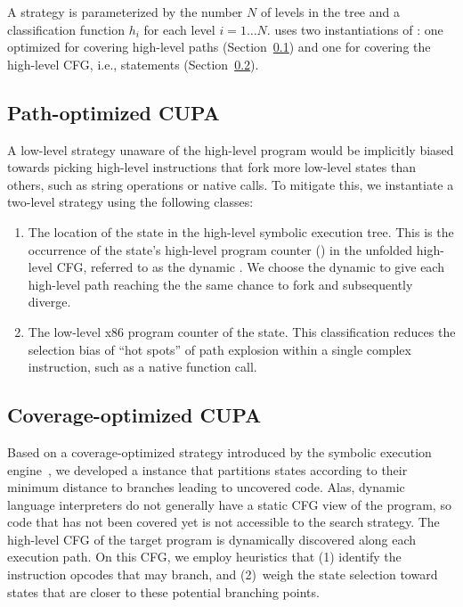 A \cupa strategy is parameterized by the number $N$ of levels in the tree and a classification function $h_i$ for each level $i=1 \ldots N$.  \chef uses two instantiations of \cupa: one optimized for covering high-level paths (Section~\ref{sec:chef:cupa-paths}) and one for covering the high-level CFG, i.e., statements (Section~\ref{sec:chef:cupa-coverage}).

\subsection{Path-optimized CUPA}
\label{sec:chef:cupa-paths}

A low-level strategy unaware of the high-level program would be implicitly biased towards picking high-level instructions that fork more low-level states than others, such as string operations or native calls.
%
To mitigate this, we instantiate a two-level \cupa strategy using the following classes:
\begin{enumerate}
\item The location of the state in the high-level symbolic execution tree.  This is the occurrence of the state's high-level program counter (\hlpc) in the unfolded high-level CFG, referred to as the dynamic \hlpc.  We choose the dynamic \hlpc to give each high-level path reaching the \hlpc the same chance to fork and subsequently diverge.
\item The low-level x86 program counter of the state.  This classification reduces the selection bias of ``hot spots'' of path explosion within a single complex instruction, such as a native function call.
\end{enumerate}

\subsection{Coverage-optimized CUPA}
\label{sec:chef:cupa-coverage}

Based on a coverage-optimized strategy introduced by the \klee symbolic execution engine~\cite{klee}, we developed a \cupa instance that partitions states according to their minimum distance to branches leading to uncovered code.
%
Alas, dynamic language interpreters do not generally have a static CFG view of the program, so code that has not been covered yet is not accessible to the search strategy.  The high-level CFG of the target program is dynamically discovered along each execution path.  On this CFG, we employ heuristics that (1) identify the instruction opcodes that may branch, and (2)~weigh the state selection toward states that are closer to these potential branching points.

